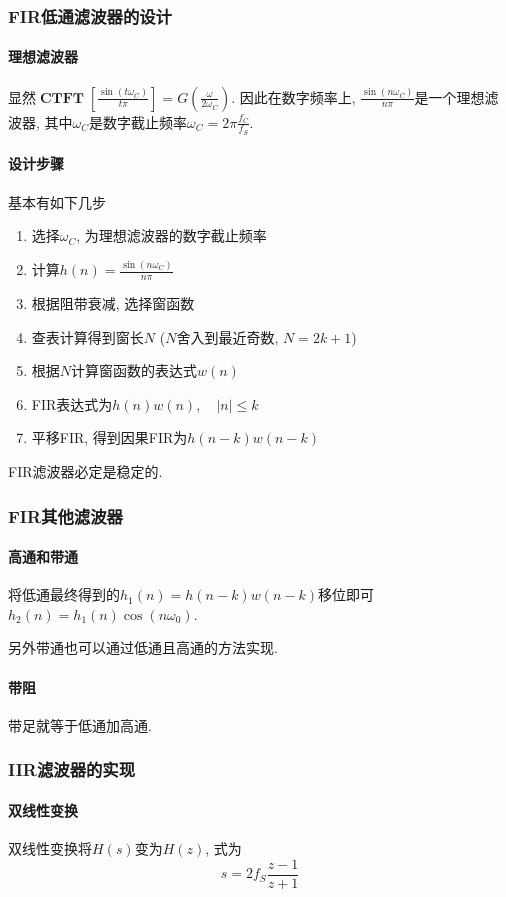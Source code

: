 \documentclass{ctexart}
\DeclareMathOperator{\CTFT}{\mathbf{CTFT}}
\begin{document}
\subsubsection{FIR低通滤波器的设计}
\paragraph{理想滤波器} 显然$\CTFT[\frac{\sin(t \omega_C)}{t \pi}] = G(\frac{\omega}{2\omega_C})$.
    因此在数字频率上, $\frac{\sin(n \omega_C)}{n \pi}$是一个理想滤波器,
    其中$\omega_C$是数字截止频率$\omega_C = 2\pi \frac{f_C}{f_S}$.
\paragraph{设计步骤} 基本有如下几步 \begin{enumerate}
        \item 选择$\omega_C$, 为理想滤波器的数字截止频率
        \item 计算$h(n) = \frac{\sin(n \omega_C)}{n \pi}$
        \item 根据阻带衰减, 选择窗函数
        \item 查表计算得到窗长$N$ ($N$舍入到最近奇数, $N = 2k +1$)
        \item 根据$N$计算窗函数的表达式$w(n)$
        \item FIR表达式为$h(n)w(n),\quad |n| \le k$
        \item 平移FIR, 得到因果FIR为$h(n-k)w(n-k)$
    \end{enumerate}
    FIR滤波器必定是稳定的.
\subsubsection{FIR其他滤波器}
\paragraph{高通和带通} 将低通最终得到的$h_1(n) = h(n-k)w(n-k)$移位即可$h_2(n) = h_1(n) \cos(n\omega_0)$.\par
    另外带通也可以通过低通且高通的方法实现.
\paragraph{带阻} 带足就等于低通加高通.
\subsubsection{IIR滤波器的实现}
\paragraph{双线性变换} 双线性变换将$H(s)$变为$H(z)$, 式为\[
        s = 2 f_S \frac{z-1}{z+1}\]
\end{document}
